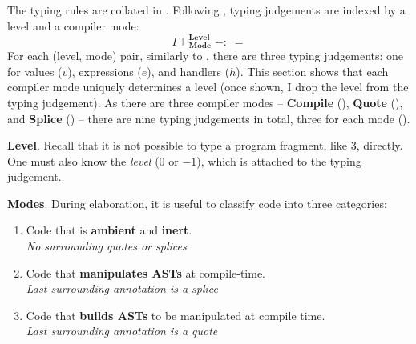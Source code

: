 The \sourceLang{} typing rules are collated in . Following \citet{xie-2023}, typing judgements are indexed by a level and a compiler mode:
\[\Gamma \vdash^{\textbf{Level}}_{\textbf{Mode}} -: \; =\]
For each (level, mode) pair, similarly to \efflang{}, there are three typing judgements: one for values ($v$), expressions ($e$), and handlers ($h$). This section shows that each compiler mode uniquely determines a level (once shown, I drop the level from the typing judgement). As there are three compiler modes -- \textbf{Compile} (\compilemode{}), \textbf{Quote} (\quotemode{}), and \textbf{Splice} (\splicemode{}) -- there are nine typing judgements in total, three for each mode ().

\textbf{Level}. Recall that it is not possible to type a program fragment, like \textsf{3}, directly. One must also know the \textit{level} ($0$ or $-1$), which is attached to the typing judgement.

\textbf{Modes}. During elaboration, it is useful to classify code into three categories:

\begin{enumerate}
  \item[\compilemode] Code that is \textcolor{compile}{\textbf{ambient}} and \textcolor{compile}{\textbf{inert}}.\\
  \textit{No surrounding quotes or splices}
  \item[\splicemode] Code that \textcolor{splice}{\textbf{manipulates ASTs}} at compile-time. \\
  \textit{Last surrounding annotation is a splice}
  \item[\quotemode] Code that \textcolor{quote}{\textbf{builds ASTs}} to be manipulated at compile time. \\
  \textit{Last surrounding annotation is a quote}
\end{enumerate}

